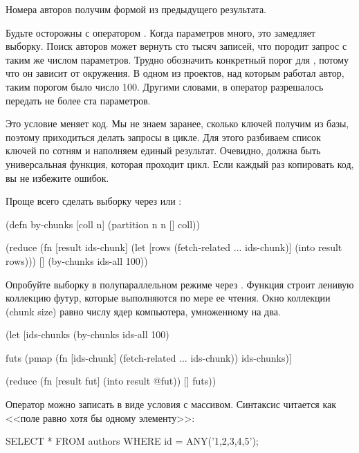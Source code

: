 Номера авторов получим формой  из предыдущего результата.

Будьте осторожны с оператором . Когда параметров много, это замедляет выборку. Поиск авторов может вернуть сто тысяч записей, что породит запрос с таким же числом параметров. Трудно обозначить конкретный порог для , потому что он зависит от окружения. В одном из проектов, над которым работал автор, таким порогом было число 100. Другими словами, в оператор  разрешалось передать не более ста параметров.

Это условие меняет код. Мы не знаем заранее, сколько ключей получим из базы, поэтому приходиться делать запросы в цикле. Для этого разбиваем список ключей по сотням и наполняем единый результат. Очевидно, должна быть универсальная функция, которая проходит цикл. Если каждый раз копировать код, вы не избежите ошибок.

Проще всего сделать выборку через  или :

\begin{english}
  \begin{clojure}
(defn by-chunks [coll n]
  (partition n n [] coll))

(reduce
 (fn [result ids-chunk]
   (let [rows (fetch-related ... ids-chunk)]
     (into result rows)))
 []
 (by-chunks ids-all 100))
  \end{clojure}
\end{english}

Опробуйте выборку в полупараллельном режиме через . Функция строит ленивую коллекцию футур, которые выполняются по мере ее чтения. Окно коллекции (chunk size) равно числу ядер компьютера, умноженному на два.

\begin{english}
  \begin{clojure}
(let [ids-chunks
      (by-chunks ids-all 100)

      futs
      (pmap (fn [ids-chunk]
              (fetch-related ... ids-chunk))
            ids-chunks)]

  (reduce
   (fn [result fut]
     (into result @fut))
   []
   futs))
  \end{clojure}
\end{english}

Оператор  можно записать в виде условия  с массивом. Синтаксис читается как <<поле  равно хотя бы одному элементу>>:

\begin{english}
  \begin{clojure}
SELECT * FROM authors WHERE id = ANY('{1,2,3,4,5}');
  \end{clojure}
\end{english}

